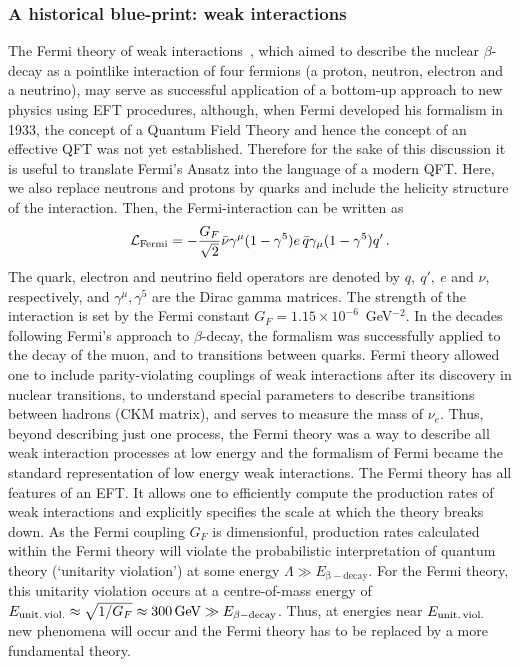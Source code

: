\subsubsection{A historical blue-print: weak interactions}
\label{ssec:Fermi}

The Fermi theory of weak interactions~\citep{Fermi1934}, which aimed to describe the nuclear $\beta $-decay
as a pointlike interaction of four fermions (a proton, neutron, electron and a neutrino),
may serve as successful application of  a bottom-up approach to new physics using EFT procedures,
although, when Fermi developed his formalism in 1933, the concept of a
Quantum Field Theory and hence the concept of an effective QFT was not
yet established. Therefore for the sake of this discussion it is useful to translate Fermi's Ansatz
into the language of a modern QFT.
Here, we also replace neutrons and protons by quarks and include the 
helicity structure of the interaction. Then, the Fermi-interaction can
be written as
\begin{equation}\label{eq:Fermi}
{\cal L}_{\rm Fermi} = -\frac{G_F}{\sqrt2}\bar\nu\gamma^\mu(1-\gamma^5)e\,\bar q\gamma_\mu(1-\gamma^5)q'\,.
\end{equation}
The quark, electron and neutrino field operators are denoted by $q,\ q',\ e$ and $\nu$, respectively, and $\gamma^\mu, \gamma^5$ are the Dirac gamma matrices. 
The strength of the interaction is set by the Fermi constant $G_F = 1.15 \times 10^{-6}$~GeV$^{-2}$. 
In the decades following Fermi's approach to $\beta $-decay, the formalism  was successfully applied to the decay of the muon, and  to transitions between quarks. 
Fermi theory allowed one to include parity-violating couplings of weak interactions after its discovery in nuclear transitions, to understand special parameters to describe transitions between hadrons (CKM matrix), and serves to measure the mass of $\nu_e$. 
Thus, beyond describing just one process, the Fermi theory was a way to describe all weak interaction processes at low energy and the formalism of Fermi became the standard representation of low energy weak interactions. 
The Fermi theory has all features of an EFT. 
It allows one to efficiently compute the production rates of weak interactions and explicitly specifies the scale at which the theory breaks down.
As the Fermi coupling $G_F$ is dimensionful, production rates
calculated within the Fermi theory will violate the probabilistic
interpretation of quantum theory (`unitarity violation') at
some energy $\Lambda \gg E_{\mathrm{\beta-decay}}$. For the Fermi
theory, this unitarity violation occurs at a centre-of-mass energy of
$E_{\rm unit.\, viol.}\approx \sqrt{1/G_F} \approx
300\,\mathrm{GeV}\gg E_{\mathrm{\beta-decay}}$. Thus, at energies near
$E_{\rm unit.\, viol.}$ new phenomena will occur and the Fermi theory
has to be replaced by a more fundamental theory. 

